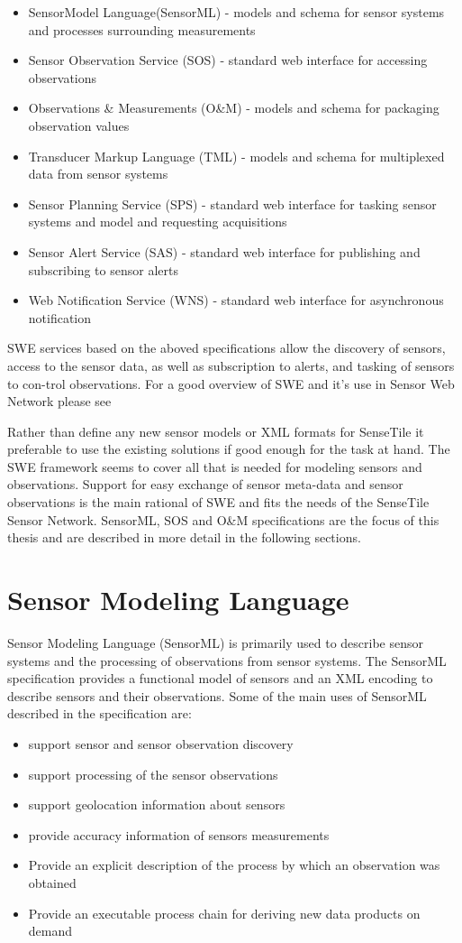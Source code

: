 \documentclass[]{final_report}
\begin{document}
\begin{itemize}
\item  SensorModel Language(SensorML) - models and schema for sensor systems and processes surrounding measurements
\item  Sensor Observation Service (SOS) - standard web interface for accessing observations
\item  Observations \& Measurements (O\&M) - models and schema for packaging observation values
\item  Transducer Markup Language (TML) - models and schema for multiplexed data from sensor systems
\item  Sensor Planning Service (SPS) - standard web interface for tasking sensor systems and model and requesting acquisitions
\item   Sensor Alert Service (SAS) - standard web interface for publishing and subscribing to sensor alerts
\item   Web Notification Service (WNS) - standard web interface for asynchronous notification
\end{itemize}

SWE services based on the aboved specifications allow the discovery of sensors, access to the sensor data, as well as subscription to alerts, and tasking of sensors to con-trol observations. For a good overview of SWE and it's use in Sensor Web Network please see \cite{SWEArchref}

Rather than define any new sensor models or XML formats for SenseTile it preferable to use the existing solutions if good enough for the task at hand. The SWE framework seems to cover all that is needed for modeling sensors and observations. Support for easy exchange of sensor meta-data and sensor observations is the main rational of SWE and fits the needs of the SenseTile Sensor Network.  SensorML, SOS and O\&M specifications are the focus of this thesis and are described in more detail in the following sections.


\section{Sensor Modeling Language}\label{SMLsection}
Sensor Modeling Language (SensorML) is primarily used to describe sensor systems and the processing of observations from sensor systems. The SensorML specification\cite{SMLref} provides a functional model of sensors and an XML encoding to describe sensors and their observations. Some of the main uses of SensorML described in the specification are:
\begin{itemize}
\item support sensor and sensor observation discovery
\item support processing of the sensor observations
\item support geolocation information about sensors
\item provide accuracy information of sensors measurements
\item Provide an explicit description of the process by which an observation was obtained
\item Provide an executable process chain for deriving new data products on demand
\end{itemize}
\end{document}

